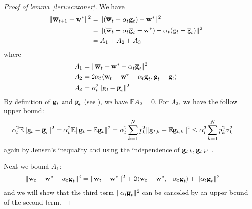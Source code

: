 \begin{proof}[Proof of lemma~\ref{lem:scvxoner}]
	We have 
	\begin{align*}
	\|{\overline{\mathbf{w}}}_{t+1}-{\mathbf{w}}^{\ast}\|^{2} & =\|({\overline{\mathbf{w}}}_{t}-\alpha_{t}{\mathbf{g}}_{t})-{\mathbf{w}}^{\ast}\|^{2}\\
	& =\|({\overline{\mathbf{w}}}_{t}-\alpha_{t}{\overline{\mathbf{g}}}_{t}-{\mathbf{w}}^{\ast})-\alpha_{t}({\mathbf{g}}_{t}-{\overline{\mathbf{g}}}_{t})\|^{2}\\
	& =A_{1}+A_{2}+A_{3}
	\end{align*}
	where 
	\begin{align*}
	A_{1} & =\|{\overline{\mathbf{w}}}_{t}-{\mathbf{w}}^{\ast}-\alpha_{t}{\overline{\mathbf{g}}}_{t}\|^{2}\\
	A_{2} & =2\alpha_{t}\langle{\overline{\mathbf{w}}}_{t}-{\mathbf{w}}^{\ast}-\alpha_{t}{\overline{\mathbf{g}}}_{t},{\overline{\mathbf{g}}}_{t}-{\mathbf{g}}_{t}\rangle\\
	A_{3} & =\alpha_{t}^{2}\|{\mathbf{g}}_{t}-{\overline{\mathbf{g}}}_{t}\|^{2}
	\end{align*}
	By definition of ${\mathbf{g}}_{t}$ and ${\overline{\mathbf{g}}}_{t}$ (see \eq{\ref{eq:gradient}}), we have $\mathbb{E}A_{2}=0$.
	For $A_{3}$, we have the follow upper bound:
	\begin{align*}
	\alpha_{t}^{2}\mathbb{E}\|{\mathbf{g}}_{t}-{\overline{\mathbf{g}}}_{t}\|^{2} & =\alpha_{t}^{2}\mathbb{E}\|{\mathbf{g}}_{t}-\mathbb{E}{\mathbf{g}}_{t}\|^{2}=\alpha_{t}^{2}\sum_{k=1}^{N}p_{k}^{2}\|{\mathbf{g}}_{t,k}-\mathbb{E}{\mathbf{g}}_{t,k}\|^{2}\leq\alpha_{t}^{2}\sum_{k=1}^{N}p_{k}^{2}\sigma_{k}^{2}
	\end{align*}
	again by Jensen's inequality and using the independence of ${\mathbf{g}}_{t,k},{\mathbf{g}}_{t,k'}$ \cite[Lemma 2]{li2019convergence}. 
	
	Next we bound $A_{1}$: 
	\begin{align*}
	\|{\overline{\mathbf{w}}}_{t}-{\mathbf{w}}^{\ast}-\alpha_{t}{\overline{\mathbf{g}}}_{t}\|^{2} & =\|{\overline{\mathbf{w}}}_{t}-{\mathbf{w}}^{\ast}\|^{2}+2\langle{\overline{\mathbf{w}}}_{t}-{\mathbf{w}}^{\ast},-\alpha_{t}{\overline{\mathbf{g}}}_{t}\rangle+\|\alpha_{t}{\overline{\mathbf{g}}}_{t}\|^{2}
	\end{align*}
	and we will show that the third term $\|\alpha_{t}{\overline{\mathbf{g}}}_{t}\|^{2}$
	can be canceled by an upper bound of the second term. %
	\begin{comment}
	The last term is straightforward to bound by the convexity of $\|\cdot\|^{2}$
	and $L$-smoothness of $F_{k}$,
	\begin{align*}
	\alpha_{t}^{2}\|\ov{g}_{t}\|^{2} & \leq\alpha_{t}^{2}\sum_{k=1}^{N}p_{k}\|\nabla F_{k}(\vw_{t}^{k})\|^{2}\leq2L\alpha_{t}^{2}\sum_{k=1}^{N}p_{k}(F_{k}(\vw_{t}^{k})-F_{k}^{\ast})
	\end{align*}
	or 
	\begin{align*}
	\alpha_{t}^{2}\|\ov{g}_{t}\|^{2} & \leq\alpha_{t}^{2}\sum_{k=1}^{N}p_{k}\|\nabla F_{k}(\vw_{t}^{k})\|^{2}\leq\alpha_{t}^{2}\sum_{k=1}^{N}p_{k}\mathbb{E}\|\nabla F_{k}(\vw_{t}^{k},\mathbf{\xi}_{t}^{k})\|^{2}\leq\alpha_{t}^{2}G^{2}
	\end{align*}
	\end{comment}
	

\end{proof}
